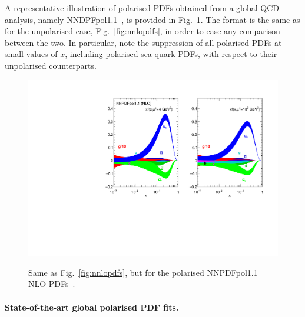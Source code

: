 A representative illustration of polarised PDFs obtained from a global
QCD analysis, namely NNDPFpol1.1~\cite{Nocera:2014gqa}, is provided in Fig.~\ref{fig:qPDFpol}.
%
The format is the same as for the unpolarised case, Fig.~\ref{fig:nnlopdfs},
in order to ease any comparison between the two.
%
In particular, note the suppression of all polarised PDFs at small values of 
$x$, including polarised sea quark PDFs, with respect to their unpolarised 
counterparts.

\begin{figure}[!t]
\centering
\includegraphics[scale=0.8]{plots/NNPDFpol11}\\
\caption{\small Same as Fig.~\ref{fig:nnlopdfs}, 
but for the polarised NNPDFpol1.1 NLO PDFs~\cite{Nocera:2014gqa}.}
\label{fig:qPDFpol}
\end{figure}

\paragraph{State-of-the-art global polarised PDF fits.}

